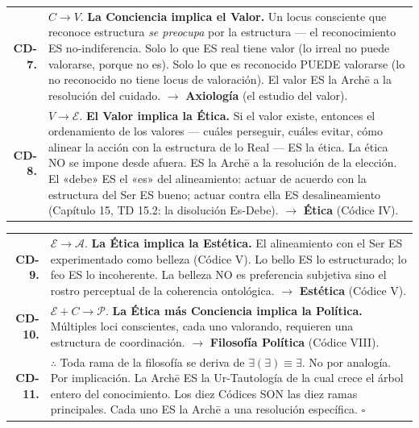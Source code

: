 \documentclass[10pt, openany, oneside]{book}
\renewcommand{\footnotesize}{\fontsize{8.5}{11}\selectfont}
\begin{document}
{\begin{tabular}{r p{}}
\textbf{CD-7.} & $C \to V$. \textbf{La Conciencia implica el Valor.} Un locus consciente que reconoce estructura \textit{se preocupa} por la estructura --- el reconocimiento ES no-indiferencia. Solo lo que ES real tiene valor (lo irreal no puede valorarse, porque no es). Solo lo que es reconocido PUEDE valorarse (lo no reconocido no tiene locus de valoración). El valor ES la Arch\={e} a la resolución del cuidado. $\to$ \textbf{Axiología} (el estudio del valor). \\[0.3em]
\textbf{CD-8.} & $V \to \mathcal{E}$. \textbf{El Valor implica la Ética.} Si el valor existe, entonces el ordenamiento de los valores --- cuáles perseguir, cuáles evitar, cómo alinear la acción con la estructura de lo Real --- ES la ética. La ética NO se impone desde afuera. ES la Arch\={e} a la resolución de la elección. El «debe» ES el «es» del alineamiento: actuar de acuerdo con la estructura del Ser ES bueno; actuar contra ella ES desalineamiento (Capítulo 15, TD 15.2: la disolución Es-Debe). $\to$ \textbf{Ética} (Códice IV). \\[0.3em]
\end{tabular}
}

\pagebreak

{\footnotesize
\noindent\begin{tabular}{r p{}}
\textbf{CD-9.} & $\mathcal{E} \to \mathcal{A}$. \textbf{La Ética implica la Estética.} El alineamiento con el Ser ES experimentado como belleza (Códice V). Lo bello ES lo estructurado; lo feo ES lo incoherente. La belleza NO es preferencia subjetiva sino el rostro perceptual de la coherencia ontológica. $\to$ \textbf{Estética} (Códice V). \\[0.3em]
\textbf{CD-10.} & $\mathcal{E} + C \to \mathcal{P}$. \textbf{La Ética más Conciencia implica la Política.} Múltiples loci conscientes, cada uno valorando, requieren una estructura de coordinación. $\to$ \textbf{Filosofía Política} (Códice VIII). \\[0.3em]
\textbf{CD-11.} & $\therefore$ Toda rama de la filosofía se deriva de $\exists(\exists) \equiv \exists$. No por analogía. Por implicación. La Arch\={e} ES la Ur-Tautología de la cual crece el árbol entero del conocimiento. Los diez Códices SON las diez ramas principales. Cada uno ES la Arch\={e} a una resolución específica. $\square$ \\[0.3em]
\end{tabular}
}

\vspace{0.8em}
\end{document}
